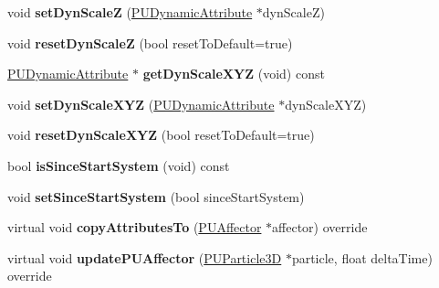 \begin{DoxyCompactItemize}
\mbox{\label{classPUScaleAffector_a49c0b19bd8af908ef0f315165787e2c6}} 
void {\bfseries set\+Dyn\+ScaleZ} (\hyperlink{classPUDynamicAttribute}{P\+U\+Dynamic\+Attribute} $\ast$dyn\+ScaleZ)
\item 
\mbox{\label{classPUScaleAffector_aed6e5af2969af77535e5b9a2e29302c3}} 
void {\bfseries reset\+Dyn\+ScaleZ} (bool reset\+To\+Default=true)
\item 
\mbox{\label{classPUScaleAffector_a7c9188f868695e55d6ad744e969fabc2}} 
\hyperlink{classPUDynamicAttribute}{P\+U\+Dynamic\+Attribute} $\ast$ {\bfseries get\+Dyn\+Scale\+X\+YZ} (void) const
\item 
\mbox{\label{classPUScaleAffector_a3ae102173f72eb3ff9007846a1fcbd95}} 
void {\bfseries set\+Dyn\+Scale\+X\+YZ} (\hyperlink{classPUDynamicAttribute}{P\+U\+Dynamic\+Attribute} $\ast$dyn\+Scale\+X\+YZ)
\item 
\mbox{\label{classPUScaleAffector_acc4a425fcc20c4677fea96b38feafd93}} 
void {\bfseries reset\+Dyn\+Scale\+X\+YZ} (bool reset\+To\+Default=true)
\item 
\mbox{\label{classPUScaleAffector_a3ab4fce16a1fe0f2ea226ef3edd48952}} 
bool {\bfseries is\+Since\+Start\+System} (void) const
\item 
\mbox{\label{classPUScaleAffector_a2746f2994a9b4c4261e4e2284f8f783f}} 
void {\bfseries set\+Since\+Start\+System} (bool since\+Start\+System)
\item 
\mbox{\label{classPUScaleAffector_a7e1f45968467c85e3d64e0c4eebb8bae}} 
virtual void {\bfseries copy\+Attributes\+To} (\hyperlink{classPUAffector}{P\+U\+Affector} $\ast$affector) override
\item 
\mbox{\label{classPUScaleAffector_acf091510d360fac2fffa1419570d44e0}} 
virtual void {\bfseries update\+P\+U\+Affector} (\hyperlink{structPUParticle3D}{P\+U\+Particle3D} $\ast$particle, float delta\+Time) override
\item 
\mbox{\label{classPUScaleAffector_a36f69c69a466909c7076736f07664062}} 

\end{DoxyCompactItemize}
